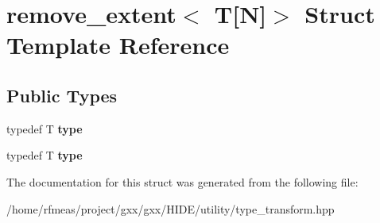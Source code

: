 \hypertarget{structremove__extent_3_01T[N]_4}{}\section{remove\+\_\+extent$<$ T\mbox{[}N\mbox{]}$>$ Struct Template Reference}
\label{structremove__extent_3_01T[N]_4}
\subsection*{Public Types}
\begin{DoxyCompactItemize}
\item 
typedef T {\bfseries type}\hypertarget{structremove__extent_3_01T[N]_4_a21449664dbc6f27e93ec44c9f2d2805e}{}\label{structremove__extent_3_01T[N]_4_a21449664dbc6f27e93ec44c9f2d2805e}

\item 
typedef T {\bfseries type}\hypertarget{structremove__extent_3_01T[N]_4_a21449664dbc6f27e93ec44c9f2d2805e}{}\label{structremove__extent_3_01T[N]_4_a21449664dbc6f27e93ec44c9f2d2805e}

\end{DoxyCompactItemize}


The documentation for this struct was generated from the following file\+:\begin{DoxyCompactItemize}
\item 
/home/rfmeas/project/gxx/gxx/\+H\+I\+D\+E/utility/type\+\_\+transform.\+hpp\end{DoxyCompactItemize}
